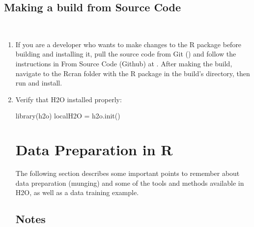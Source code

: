 \documentclass[11pt]{article}
\begin{document}
\subsection{Making a build from Source Code}\label{3.} \begin{enumerate}
\item If you are a developer who wants to make changes to the R package before building and installing it, pull the source code from Git () and follow the instructions in From Source Code (Github) at .
After making the build, navigate to the Rcran folder with the R package in the build’s directory, then run and install.


\item Verify that H2O installed properly:
\begin{spverbatim}

 library(h2o)
 localH2O = h2o.init()
\end{spverbatim}


\section{Data Preparation in R}

The following section describes some important points to remember about data preparation (munging) and some of the tools and methods available in H2O, as well as a data training example. 

\subsection{Notes}
\begin{itemize}


\end{itemize}
\end{enumerate}
\end{document}
